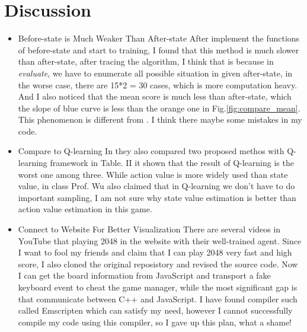 \documentclass[12pt,a4paper]{article}
\begin{document}
\section{Discussion} \label{sec:dis}
\begin{itemize}
\item {Before-state is Much Weaker Than After-state} 
After implement the functions of before-state and start to training, I found that this method is much slower than after-state, after tracing the algorithm, I think that is because in \textit{evaluate}, we have to enumerate all possible situation in given after-state, in the worse case, there are 15*2 = 30 cases, which is more computation heavy. And I also noticed that the mean score is much less than after-state, which the slope of blue curve is less than the orange one in Fig.\ref{fig:compare_mean}. This phenomenon is different from \cite{szubert2014temporal}. I think there maybe some mistakes in my code.
\item {Compare to Q-learning}
In \cite{szubert2014temporal} they also compared two proposed methos with Q-learning framework in Table. II it shown that the result of Q-learning is the worst one among three. While action value is more widely used than state value, in class Prof. Wu also claimed that in Q-learning we don't have to do important sampling, I am not sure why state value estimation is better than action value estimation in this game.
\item {Connect to Website For Better Visualization}
There are several videos in YouTube that playing 2048 in the website with their well-trained agent. Since I want to fool my friends and claim that I can play 2048 very fast and high score, I also cloned the original reposistory and revised the source code. Now I can get the board information from JavaScript and transport a fake keyboard event to cheat the game manager, while the most significant gap is that communicate between C++ and JavaScript. I have found compiler such called Emscripten which can satisfy my need, however I cannot successfully compile my code using this compiler, so I gave up this plan, what a shame!
\end{itemize}



\end{document}
